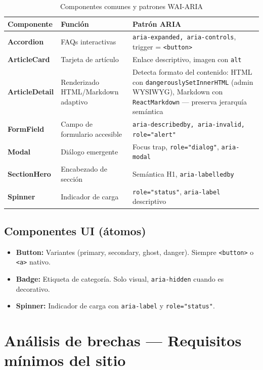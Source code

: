\documentclass[12pt, a4paper]{article}
\begin{document}
\begin{table}[H]
\centering
\caption{Componentes comunes y patrones WAI-ARIA}
\small
\begin{tabular}{@{}>{\bfseries}p{3cm} p{5cm} p{5.5cm}@{}}
\toprule
\rowcolor{royalblue!12}
\textbf{Componente} & \textbf{Función} & \textbf{Patrón ARIA} \\
\midrule
Accordion & FAQs interactivas & \texttt{aria-expanded, aria-controls}, trigger = \texttt{<button>} \\
ArticleCard & Tarjeta de artículo & Enlace descriptivo, imagen con \texttt{alt} \\
ArticleDetail & Renderizado HTML/Markdown adaptivo & Detecta formato del contenido: HTML con \texttt{dangerouslySetInnerHTML} (admin WYSIWYG), Markdown con \texttt{ReactMarkdown} — preserva jerarquía semántica \\
FormField & Campo de formulario accesible & \texttt{aria-describedby, aria-invalid, role="alert"} \\
Modal & Diálogo emergente & Focus trap, \texttt{role="dialog"}, \texttt{aria-modal} \\
SectionHero & Encabezado de sección & Semántica H1, \texttt{aria-labelledby} \\
Spinner & Indicador de carga & \texttt{role="status"}, \texttt{aria-label} descriptivo \\
\bottomrule
\end{tabular}
\end{table}

\subsection{Componentes UI (átomos)}

\begin{itemize}
  \item \textbf{Button:} Variantes (primary, secondary, ghost, danger). Siempre \texttt{<button>} o \texttt{<a>} nativo.
  \item \textbf{Badge:} Etiqueta de categoría. Solo visual, \texttt{aria-hidden} cuando es decorativo.
  \item \textbf{Spinner:} Indicador de carga con \texttt{aria-label} y \texttt{role="status"}.
\end{itemize}

\section{Análisis de brechas --- Requisitos mínimos del sitio}
\end{document}
